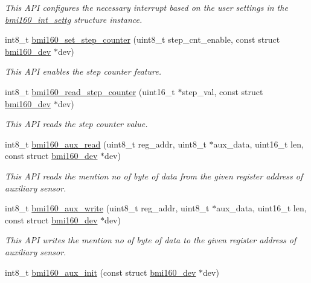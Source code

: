 \begin{DoxyCompactItemize}
\begin{DoxyCompactList}\small\item\em This A\+PI configures the necessary interrupt based on the user settings in the \hyperlink{structbmi160__int__settg}{bmi160\+\_\+int\+\_\+settg} structure instance. \end{DoxyCompactList}\item 
int8\+\_\+t \hyperlink{group__bmi160_ga5a9e71230b2c94b2e609c63def130abf}{bmi160\+\_\+set\+\_\+step\+\_\+counter} (uint8\+\_\+t step\+\_\+cnt\+\_\+enable, const struct \hyperlink{structbmi160__dev}{bmi160\+\_\+dev} $\ast$dev)
\begin{DoxyCompactList}\small\item\em This A\+PI enables the step counter feature. \end{DoxyCompactList}\item 
int8\+\_\+t \hyperlink{group__bmi160_ga69193a88550ccf1d99e413dcb5f81730}{bmi160\+\_\+read\+\_\+step\+\_\+counter} (uint16\+\_\+t $\ast$step\+\_\+val, const struct \hyperlink{structbmi160__dev}{bmi160\+\_\+dev} $\ast$dev)
\begin{DoxyCompactList}\small\item\em This A\+PI reads the step counter value. \end{DoxyCompactList}\item 
int8\+\_\+t \hyperlink{group__bmi160_gab7dba610f920f63a03e84d80be2aa4db}{bmi160\+\_\+aux\+\_\+read} (uint8\+\_\+t reg\+\_\+addr, uint8\+\_\+t $\ast$aux\+\_\+data, uint16\+\_\+t len, const struct \hyperlink{structbmi160__dev}{bmi160\+\_\+dev} $\ast$dev)
\begin{DoxyCompactList}\small\item\em This A\+PI reads the mention no of byte of data from the given register address of auxiliary sensor. \end{DoxyCompactList}\item 
int8\+\_\+t \hyperlink{group__bmi160_ga2c95d58ed7b50773fae5d97173fc6cb6}{bmi160\+\_\+aux\+\_\+write} (uint8\+\_\+t reg\+\_\+addr, uint8\+\_\+t $\ast$aux\+\_\+data, uint16\+\_\+t len, const struct \hyperlink{structbmi160__dev}{bmi160\+\_\+dev} $\ast$dev)
\begin{DoxyCompactList}\small\item\em This A\+PI writes the mention no of byte of data to the given register address of auxiliary sensor. \end{DoxyCompactList}\item 
int8\+\_\+t \hyperlink{group__bmi160_gaf9a909f6c1b3be1b33658b2f17632d35}{bmi160\+\_\+aux\+\_\+init} (const struct \hyperlink{structbmi160__dev}{bmi160\+\_\+dev} $\ast$dev)

\end{DoxyCompactItemize}
